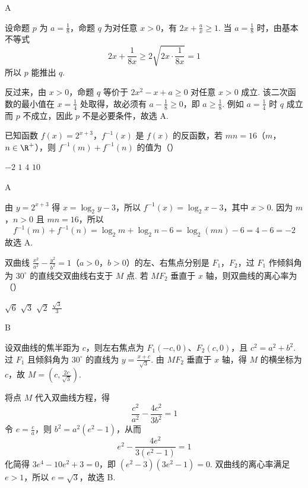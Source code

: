 \begin{answer}
A
\end{answer}

\begin{solution}
设命题 \(p\) 为 \(a=\frac18\)，命题 \(q\) 为对任意 \(x>0\)，有 \(2x+\frac{a}{x}\geqslant1\). 当 \(a=\frac18\) 时，由基本不等式
\[
2x+\frac{1}{8x}\geqslant2\sqrt{2x\cdot\frac{1}{8x}}=1
\]
所以 \(p\) 能推出 \(q\).

反过来，由 \(x>0\)，命题 \(q\) 等价于 \(2x^2-x+a\geqslant0\) 对任意 \(x>0\) 成立. 该二次函数的最小值在 \(x=\frac14\) 处取得，故必须有 \(a-\frac18\geqslant0\)，即 \(a\geqslant\frac18\). 例如 \(a=\frac14\) 时 \(q\) 成立而 \(p\) 不成立，因此 \(p\) 不是必要条件，故选 A.
\end{solution}

\begin{problem}
已知函数 \( f(x) = 2^{x + 3} \)，\( f^{-1}(x) \) 是 \( f(x) \) 的反函数，若 \( mn = 16\)（\(m\)，\(n \in \R^+\)），则 \( f^{-1}(m) + f^{-1}(n) \) 的值为（\quad）

\choices
    {\(-2\)}
    {\(1\)}
    {\(4\)}
    {\(10\)}
\end{problem}

\begin{answer}
A
\end{answer}

\begin{solution}
由 \(y=2^{x+3}\) 得 \(x=\log_2 y-3\)，所以 \(f^{-1}(x)=\log_2x-3\)，其中 \(x>0\). 因为 \(m\)，\(n>0\) 且 \(mn=16\)，所以
\[
f^{-1}(m)+f^{-1}(n)=\log_2m+\log_2n-6=\log_2(mn)-6=4-6=-2
\]
故选 A.
\end{solution}

\begin{problem}
双曲线 \(\frac{x^2}{a^2} - \frac{y^2}{b^2} = 1\)（\(a > 0\)，\(b > 0\)）的左、右焦点分别是 \(F_1\)，\(F_2\)，过 \(F_1\) 作倾斜角为 \(30^\circ\) 的直线交双曲线右支于 \(M\) 点. 若 \(MF_{2}\) 垂直于 \(x\) 轴，则双曲线的离心率为（\quad）

\choices
    {\(\sqrt{6}\)}
    {\(\sqrt{3}\)}
    {\(\sqrt{2}\)}
    {\(\frac{\sqrt{3}}{3}\)}
\end{problem}

\begin{answer}
B
\end{answer}

\begin{solution}
设双曲线的焦半距为 \(c\)，则左右焦点为 \(F_1(-c,0)\)、\(F_2(c,0)\)，且 \(c^2=a^2+b^2\). 过 \(F_1\) 且倾斜角为 \(30^{\circ}\) 的直线为 \(y=\frac{x+c}{\sqrt{3}}\). 由 \(MF_2\) 垂直于 \(x\) 轴，得 \(M\) 的横坐标为 \(c\)，故 \(M=\left(c,\frac{2c}{\sqrt{3}}\right)\).

将点 \(M\) 代入双曲线方程，得
\[
\frac{c^2}{a^2}-\frac{4c^2}{3b^2}=1
\]
令 \(e=\frac ca\)，则 \(b^2=a^2(e^2-1)\)，从而
\[
e^2-\frac{4e^2}{3(e^2-1)}=1
\]
化简得 \(3e^4-10e^2+3=0\)，即 \((e^2-3)(3e^2-1)=0\). 双曲线的离心率满足 \(e>1\)，所以 \(e=\sqrt{3}\)，故选 B.
\end{solution}

